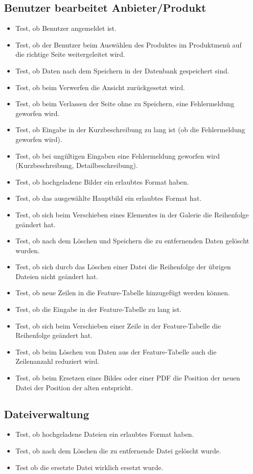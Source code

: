 \documentclass[a4paper,12pt]{article}
\begin{document}
\subsection{Benutzer bearbeitet Anbieter/Produkt}
\begin{itemize}
\item Test, ob Benutzer angemeldet ist.
\item Test, ob der Benutzer beim Auswählen des Produktes im Produktmenü auf die richtige Seite weitergeleitet wird.
\item Test, ob Daten nach dem Speichern in der Datenbank gespeichert sind. 
\item Test, ob beim Verwerfen die Ansicht zurückgesetzt wird. 
\item Test, ob beim Verlassen der Seite ohne zu Speichern, eine Fehlermeldung geworfen wird. 
\item Test, ob Eingabe in der Kurzbeschreibung zu lang ist (ob die Fehlermeldung geworfen wird).
\item Test, ob bei ungültigen Eingaben eine Fehlermeldung geworfen wird (Kurzbeschreibung, Detailbeschreibung).
\item Test, ob hochgeladene Bilder ein erlaubtes Format haben.
\item Test, ob das ausgewählte Hauptbild ein erlaubtes Format hat.
\item Test, ob sich beim Verschieben eines Elementes in der Galerie die Reihenfolge geändert hat.
\item Test, ob nach dem Löschen und Speichern die zu entfernenden Daten gelöscht wurden.
\item Test, ob sich durcb das Löschen einer Datei die Reihenfolge der übrigen Dateien nicht geändert hat.
\item Test, ob neue Zeilen in die Feature-Tabelle hinzugefügt werden können.
\item Test, ob die Eingabe in der Feature-Tabelle zu lang ist.
\item Test, ob sich beim Verschieben einer Zeile in der Feature-Tabelle die Reihenfolge geändert hat.
\item Test, ob beim Löschen von Daten aus der Feature-Tabelle auch die Zeilenanzahl reduziert wird.
\item Test, ob beim Ersetzen eines Bildes oder einer PDF die Position der neuen Datei der Position der alten entspricht.
\end{itemize}

\subsection{Dateiverwaltung}
\begin{itemize}
\item Test, ob hochgeladene Dateien ein erlaubtes Format haben.
\item Test, ob nach dem Löschen die zu entfernende Datei gelöscht wurde.
\item Test ob die ersetzte Datei wirklich ersetzt wurde.
\end{itemize}
\end{document}
